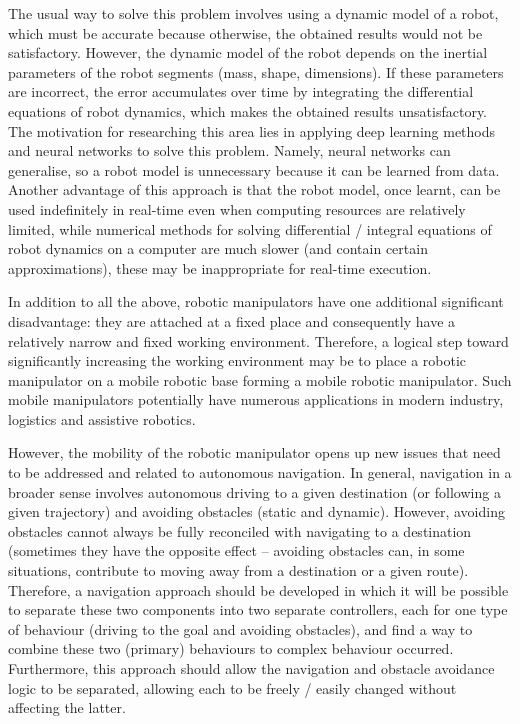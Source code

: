 The usual way to solve this problem involves using a dynamic model of a robot, which must be accurate because otherwise, the obtained results would not be satisfactory. However, the dynamic model of the robot depends on the inertial parameters of the robot segments (mass, shape, dimensions). If these parameters are incorrect, the error accumulates over time by integrating the differential equations of robot dynamics, which makes the obtained results unsatisfactory. The motivation for researching this area lies in applying deep learning methods and neural networks to solve this problem. Namely, neural networks can generalise, so a robot model is unnecessary because it can be learned from data. Another advantage of this approach is that the robot model, once learnt, can be used indefinitely in real-time even when computing resources are relatively limited, while numerical methods for solving differential / integral equations of robot dynamics on a computer are much slower (and contain certain approximations), these may be inappropriate for real-time execution.

In addition to all the above, robotic manipulators have one additional significant disadvantage: they are attached at a fixed place and consequently have a relatively narrow and fixed working environment. Therefore, a logical step toward significantly increasing the working environment may be to place a robotic manipulator on a mobile robotic base forming a mobile robotic manipulator. Such mobile manipulators potentially have numerous applications in modern industry, logistics and assistive robotics.

However, the mobility of the robotic manipulator opens up new issues that need to be addressed and related to autonomous navigation. In general, navigation in a broader sense involves autonomous driving to a given destination (or following a given trajectory) and avoiding obstacles (static and dynamic). However, avoiding obstacles cannot always be fully reconciled with navigating to a destination (sometimes they have the opposite effect -- avoiding obstacles can, in some situations, contribute to moving away from a destination or a given route). Therefore, a navigation approach should be developed in which it will be possible to separate these two components into two separate controllers, each for one type of behaviour (driving to the goal and avoiding obstacles), and find a way to combine these two (primary) behaviours to complex behaviour occurred. Furthermore, this approach should allow the navigation and obstacle avoidance logic to be separated, allowing each to be freely / easily changed without affecting the latter.

\newpage
